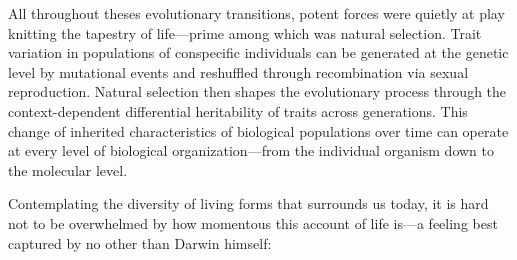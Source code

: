 
All throughout theses evolutionary transitions, potent forces were quietly at
play knitting the tapestry of life---prime among which was natural selection.
Trait variation in populations of conspecific individuals can be generated at
the genetic level by mutational events and reshuffled through recombination via
sexual reproduction.  Natural selection then shapes the evolutionary process
through the \mbox{context-dependent} differential heritability of traits across
generations.  This change of inherited characteristics of biological populations
over time can operate at every level of biological organization---from the
individual organism down to the molecular level.

\bigskip

Contemplating the diversity of living forms that surrounds us today, it is hard
not to be overwhelmed by how momentous this account of life is---a feeling best
captured by no other than Darwin himself:\cite{darwin_origin_1864}





